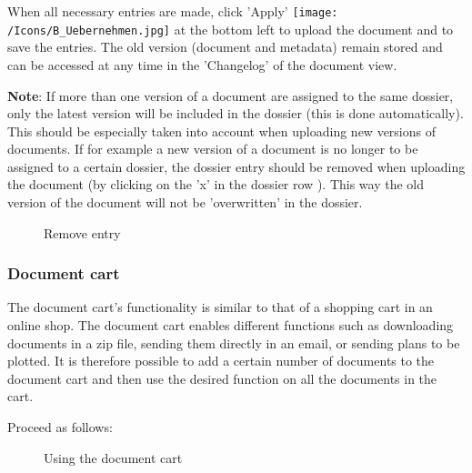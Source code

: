 \vspace{\baselineskip}

When all necessary entries are made, click 'Apply' \texttt{[image: /Icons/B\_Uebernehmen.jpg]} at the bottom left to upload the document and to save the entries. The old version (document and metadata) remain stored and can be accessed at any time in the 'Changelog' of the document view.

\vspace{\baselineskip}
\vspace{\baselineskip}

\textbf{Note}: If more than one version of a document are assigned to the same dossier, only the latest version will be included in the dossier (this is done automatically). This should be especially taken into account when uploading new versions of documents. If for example a new version of a document is no longer to be assigned to a certain dossier, the dossier entry should be removed when uploading the document (by clicking on the 'x' in the dossier row ). This way the old version of the document will not be 'overwritten' in the dossier.  

\begin{figure}[H]
\caption{Remove entry}
\end{figure}


\subsubsection{Document cart}
\label{bkm:Ref201705445}

The document cart's functionality is similar to that of a shopping cart in an online shop. The document cart enables different functions such as downloading documents in a zip file, sending them directly in an email, or sending plans to be plotted. It is therefore possible to add a certain number of documents to the document cart and then use the desired function on all the documents in the cart.

\vspace{\baselineskip}

Proceed as follows:

\begin{figure}[H]
\caption{Using the document cart}
\end{figure}

